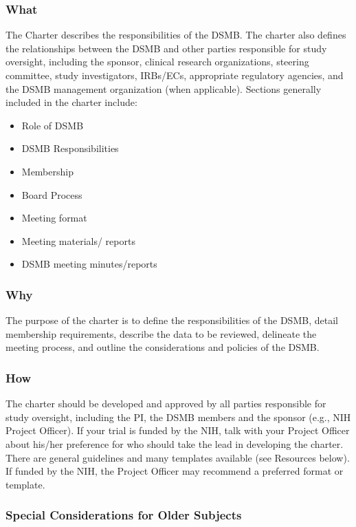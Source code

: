 \documentclass[]{book}
\providecommand{\tightlist}{%
  \setlength{\itemsep}{0pt}\setlength{\parskip}{0pt}}
\begin{document}
\subsubsection{What}\label{what-14}

The Charter describes the responsibilities of the DSMB. The charter also
defines the relationships between the DSMB and other parties responsible
for study oversight, including the sponsor, clinical research
organizations, steering committee, study investigators, IRBs/ECs,
appropriate regulatory agencies, and the DSMB management organization
(when applicable). Sections generally included in the charter include:

\begin{itemize}
\tightlist
\item
  Role of DSMB
\item
  DSMB Responsibilities
\item
  Membership
\item
  Board Process
\item
  Meeting format
\item
  Meeting materials/ reports
\item
  DSMB meeting minutes/reports
\end{itemize}

\subsubsection{Why}\label{why-14}

The purpose of the charter is to define the responsibilities of the
DSMB, detail membership requirements, describe the data to be reviewed,
delineate the meeting process, and outline the considerations and
policies of the DSMB.

\subsubsection{How}\label{how-14}

The charter should be developed and approved by all parties responsible
for study oversight, including the PI, the DSMB members and the sponsor
(e.g., NIH Project Officer). If your trial is funded by the NIH, talk
with your Project Officer about his/her preference for who should take
the lead in developing the charter. There are general guidelines and
many templates available (see Resources below). If funded by the NIH,
the Project Officer may recommend a preferred format or template.

\subsubsection{Special Considerations for Older
Subjects}\label{special-considerations-for-older-subjects-9}
\end{document}

